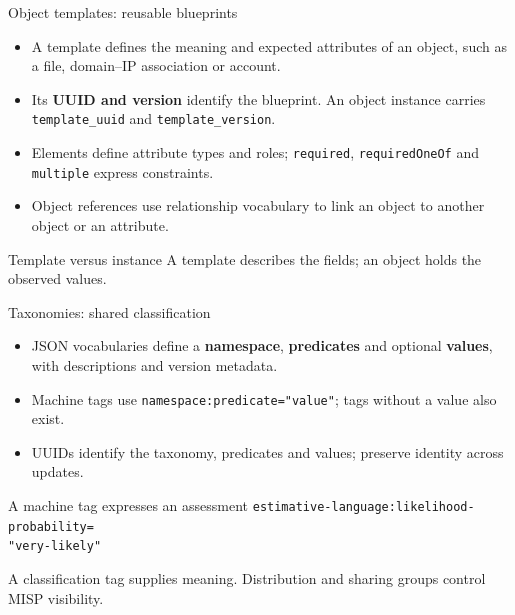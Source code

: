 \begin{frame}{Object templates: reusable blueprints}
\begin{itemize}
  \item A template defines the meaning and expected attributes of an object, such as a file, domain--IP association or account.
  \item Its \textbf{UUID and version} identify the blueprint. An object instance carries \texttt{template\_uuid} and \texttt{template\_version}.
  \item Elements define attribute types and roles; \texttt{required}, \texttt{requiredOneOf} and \texttt{multiple} express constraints.
  \item Object references use relationship vocabulary to link an object to another object or an attribute.
\end{itemize}
\begin{block}{Template versus instance}
A template describes the fields; an object holds the observed values.
\end{block}
\end{frame}

\begin{frame}[fragile]{Taxonomies: shared classification}
\begin{itemize}
  \item JSON vocabularies define a \textbf{namespace}, \textbf{predicates} and optional \textbf{values}, with descriptions and version metadata.
  \item Machine tags use \texttt{namespace:predicate="value"}; tags without a value also exist.
  \item UUIDs identify the taxonomy, predicates and values; preserve identity across updates.
\end{itemize}
\begin{block}{A machine tag expresses an assessment}
\texttt{estimative-language:likelihood-probability=}\\
\texttt{"very-likely"}
\end{block}
\small A classification tag supplies meaning. Distribution and sharing groups control MISP visibility.
\end{frame}

